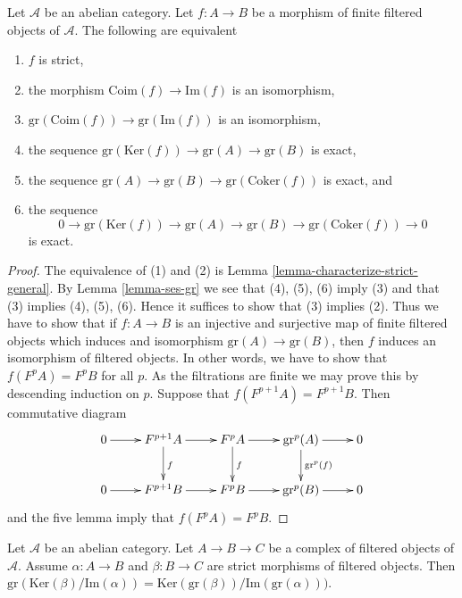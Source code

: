 \begin{lemma}
\label{lemma-characterize-strict}
Let $\mathcal{A}$ be an abelian category.
Let $f : A \to B$ be a morphism of finite
filtered objects of $\mathcal{A}$. The following are equivalent
\begin{enumerate}
\item $f$ is strict,
\item the morphism $\text{Coim}(f) \to \text{Im}(f)$ is an isomorphism,
\item $\text{gr}(\text{Coim}(f)) \to \text{gr}(\text{Im}(f))$ is an
isomorphism,
\item the sequence
$\text{gr}(\text{Ker}(f)) \to \text{gr}(A) \to \text{gr}(B)$
is exact,
\item the sequence $\text{gr}(A) \to \text{gr}(B) \to
\text{gr}(\text{Coker}(f))$ is exact, and
\item the sequence
$$
0 \to
\text{gr}(\text{Ker}(f)) \to
\text{gr}(A) \to
\text{gr}(B) \to
\text{gr}(\text{Coker}(f)) \to 0
$$
is exact.
\end{enumerate}
\end{lemma}

\begin{proof}
The equivalence of (1) and (2) is
Lemma \ref{lemma-characterize-strict-general}.
By
Lemma \ref{lemma-ses-gr}
we see that (4), (5), (6) imply (3) and that (3) implies (4), (5), (6).
Hence it suffices to show that (3) implies (2).
Thus we have to show that if $f : A \to B$ is an injective and surjective
map of finite filtered objects which induces and isomorphism
$\text{gr}(A) \to \text{gr}(B)$, then $f$ induces an isomorphism of
filtered objects. In other words, we have to show that
$f(F^pA) = F^pB$ for all $p$.
As the filtrations are finite we may prove this by descending induction
on $p$. Suppose that $f(F^{p + 1}A) = F^{p + 1}B$.
Then commutative diagram
$$
\xymatrix{
0 \ar[r] &
F^{p + 1}A \ar[r] \ar[d]^f &
F^pA \ar[r] \ar[d]^f &
\text{gr}^p(A) \ar[r] \ar[d]^{\text{gr}^p(f)} &
0 \\
0 \ar[r] &
F^{p + 1}B \ar[r] &
F^pB \ar[r] &
\text{gr}^p(B) \ar[r] &
0
}
$$
and the five lemma imply that $f(F^pA) = F^pB$.
\end{proof}

\begin{lemma}
\label{lemma-filtered-complex}
Let $\mathcal{A}$ be an abelian category. Let $A \to B \to C$ be a complex
of filtered objects of $\mathcal{A}$. Assume $\alpha : A \to B$ and
$\beta : B \to C$ are strict morphisms of filtered objects. Then
$\text{gr}(\text{Ker}(\beta)/\text{Im}(\alpha)) =
\text{Ker}(\text{gr}(\beta))/\text{Im}(\text{gr}(\alpha)))$.
\end{lemma}

